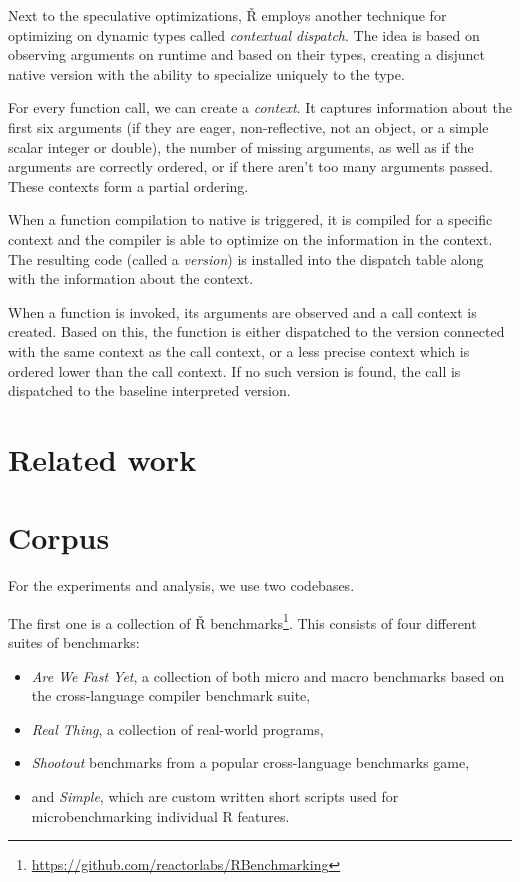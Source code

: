 Next to the speculative optimizations, Ř employs another technique for optimizing on dynamic types called \textit{contextual dispatch}\cite{ctx-dispatch}. The idea is based on observing arguments on runtime and based on their types, creating a disjunct native version with the ability to specialize uniquely to the type.

For every function call, we can create a \textit{context}. It captures information about the first six arguments (if they are eager, non-reflective, not an object, or a simple scalar integer or double), the number of missing arguments, as well as if the arguments are correctly ordered, or if there aren’t too many arguments passed. These contexts form a partial ordering.

When a function compilation to native is triggered, it is compiled for a specific context and the compiler is able to optimize on the information in the context. The resulting code (called a \textit{version}) is installed into the dispatch table along with the information about the context.

When a function is invoked, its arguments are observed and a call context is created. Based on this, the function is either dispatched to the version connected with the same context as the call context, or a less precise context which is ordered lower than the call context. If no such version is found, the call is dispatched to the baseline interpreted version.

\section{Related work}

\todoadd

\section{Corpus}\label{ch:1-corpus}

For the experiments and analysis, we use two codebases.

The first one is a collection of Ř benchmarks\footnote{\url{https://github.com/reactorlabs/RBenchmarking}}. This consists of four different suites of benchmarks:
\begin{itemize}
	\item{} \textit{Are We Fast Yet}, a collection of both micro and macro benchmarks based on the cross-language compiler benchmark suite\cite{are-we-fast-yet},
	\item{} \textit{Real Thing}, a collection of real-world programs,
	\item{} \textit{Shootout} benchmarks from a popular cross-language benchmarks game\cite{shootout},
	\item{} and \textit{Simple}, which are custom written short scripts used for microbenchmarking individual R features.
\end{itemize}


